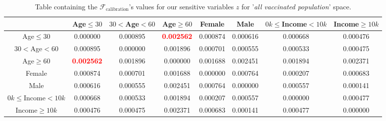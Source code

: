 \documentclass{article}
\begin{document}
\begin{table}[H]
    \begin{adjustbox}{max width=\textwidth}
        \begin{tabular}{|c| c c c c c c c|}
        \hline
          & Age$\leq30$ &    $30<$Age$<60$ &     Age$\geq60$ &    Female &      Male &   $0k\leq$Income$<10k$ &    Income$\geq10k$  \\
        \hline
         Age$\leq30$ &  0.000000 &  0.000895 &  \textbf{\textcolor{red}{0.002562}}  &  0.000874 &  0.000616 &  0.000668 &  0.000476 \\
        \hline
        $30<$Age$<60$ &  0.000895 &  0.000000 &  0.001896 &  0.000701 &  0.000555 &  0.000533 &  0.000475 \\
        \hline
        Age$\geq60$ &  \textbf{\textcolor{red}{0.002562}}  &  0.001896 &  0.000000 &  0.001688 &  0.002451 &  0.001894 &  0.002371 \\
        \hline
        Female &  0.000874 &  0.000701 &  0.001688 &  0.000000 &  0.000764 &  0.000207 &  0.000683 \\
        \hline
        Male &  0.000616 &  0.000555 &  0.002451 &  0.000764 &  0.000000 &  0.000557 &  0.000141 \\
        \hline
        $0k\leq$Income$<10k$ &  0.000668 &  0.000533 &  0.001894 &  0.000207 &  0.000557 &  0.000000 &  0.000477 \\
        \hline
        Income$\geq10k$ &  0.000476 &  0.000475 &  0.002371 &  0.000683 &  0.000141 &  0.000477 &  0.000000
        \\ \hline
        \end{tabular}
    \end{adjustbox}
\caption{Table containing the $\mathcal{F}_{\text{calibration}}$'s values for our sensitive variables $z$ for '\textit{all vaccinated population}' space.}
\label{tab:14}
\end{table}
\end{document}
